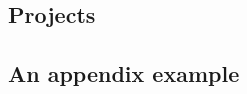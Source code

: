 \appendixes


\begin {addendum}
\chapter { Projects }
\section { An appendix example }
\end{addendum}